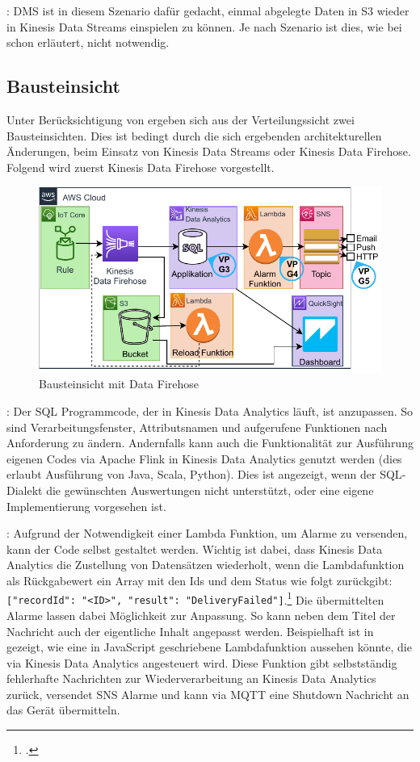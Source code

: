 : \ac{DMS} ist in diesem Szenario dafür gedacht, einmal abgelegte Daten in S3 wieder in Kinesis Data Streams einspielen zu können. Je nach Szenario ist dies, wie bei  schon erläutert, nicht notwendig.

\subsection{Bausteinsicht}
Unter Berücksichtigung von  ergeben sich aus der Verteilungssicht zwei Bausteinsichten. Dies ist bedingt durch die sich ergebenden architekturellen Änderungen, beim Einsatz von Kinesis Data Streams oder Kinesis Data Firehose. Folgend wird zuerst Kinesis Data Firehose vorgestellt.

\begin{figure}[H]
\centering
\includegraphics[width=\textwidth]{graphics/Echtzeit-RA-Elements-Firehose.pdf}
\caption{Bausteinsicht mit Data Firehose}
\label{abb:ElementeEchtzeitRA}
\end{figure}

: Der \ac{SQL} Programmcode, der in Kinesis Data Analytics läuft, ist anzupassen. So sind Verarbeitungsfenster, Attributsnamen und aufgerufene Funktionen nach Anforderung zu ändern. Andernfalls kann auch die Funktionalität zur Ausführung eigenen Codes via Apache Flink in Kinesis Data Analytics genutzt werden (dies erlaubt Ausführung von Java, Scala, Python). Dies ist angezeigt, wenn der \ac{SQL}-Dialekt die gewünschten Auswertungen nicht unterstützt, oder eine eigene Implementierung vorgesehen ist.

: Aufgrund der Notwendigkeit einer Lambda Funktion, um Alarme zu versenden, kann der Code selbst gestaltet werden. Wichtig ist dabei, dass Kinesis Data Analytics die Zustellung von Datensätzen wiederholt, wenn die Lambdafunktion als Rückgabewert ein Array mit den Ids und dem Status wie folgt zurückgibt: \texttt{[{"recordId": "<ID>", "result": "DeliveryFailed"}]}.\footcite[Vgl.][]{AmazonWebServicesInc..o.J.ay} Die übermittelten Alarme lassen dabei Möglichkeit zur Anpassung. So kann neben dem Titel der Nachricht auch der eigentliche Inhalt angepasst werden. Beispielhaft ist in  gezeigt, wie eine in JavaScript geschriebene Lambdafunktion aussehen könnte, die via Kinesis Data Analytics angesteuert wird. Diese Funktion gibt selbstständig fehlerhafte Nachrichten zur Wiederverarbeitung an Kinesis Data Analytics zurück, versendet \ac{SNS} Alarme und kann via \ac{MQTT} eine Shutdown Nachricht an das Gerät übermitteln.


